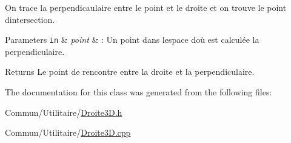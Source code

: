 On trace la perpendicaulaire entre le point et le droite et on trouve le point d\textquotesingle{}intersection.


\begin{DoxyParams}[1]{Parameters}
\mbox{\tt in}  & {\em point} & \+: Un point dans l\textquotesingle{}espace d\textquotesingle{}où est calculée la perpendiculaire.\\
\hline
\end{DoxyParams}
\begin{DoxyReturn}{Returns}
Le point de rencontre entre la droite et la perpendiculaire. 
\end{DoxyReturn}


The documentation for this class was generated from the following files\+:\begin{DoxyCompactItemize}
\item 
Commun/\+Utilitaire/\hyperlink{_droite3_d_8h}{Droite3\+D.\+h}\item 
Commun/\+Utilitaire/\hyperlink{_droite3_d_8cpp}{Droite3\+D.\+cpp}\end{DoxyCompactItemize}
